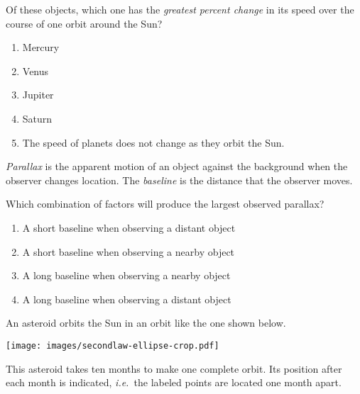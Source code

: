 \documentclass[12pt]{article}
\def\BS{\bigskip}
\newcommand{\BC}{\begin{center}}
\newcommand{\EC}{\end{center}}
\newcommand{\ie}{{\em i.e.\ }}
\begin{document}
\begin{enumerate}
\begin{minipage}{\textwidth}
{\bigskip

Of these objects, which one has the {\it greatest percent change} in its speed over the course of one orbit around the Sun?

\begin{enumerate}[label=(\Alph*)]
\setlength\itemsep{0.0em}
\item{ Mercury }
\item{ Venus }
\item{ Jupiter }
\item{ Saturn }
\item{ The speed of planets does not change as they orbit the Sun. }
\end{enumerate}
} %
\end{minipage}


\vspace{0.5in}

\begin{minipage}{\textwidth}
\item{{\it Parallax} is the apparent motion of an object against the background when the observer changes location. The {\it baseline}
is the distance that the observer moves.

Which combination of factors will produce the largest observed parallax?

\begin{enumerate}[label=(\Alph*)]
\setlength\itemsep{0.0em}
\item{ A short baseline when observing a distant object }
\item{ A short baseline when observing a nearby object }
\item{ A long baseline when observing a nearby object }
\item{ A long baseline when observing a distant object }
\end{enumerate}
} %
\end{minipage}


\vspace{0.5in}

\begin{minipage}{\textwidth}
\item{An asteroid orbits the Sun in an orbit like the one shown below.
\BS
\BC
\texttt{[image: images/secondlaw-ellipse-crop.pdf]}
\EC
\BS
This asteroid takes ten months to make one complete orbit. Its position after each month is indicated, \ie the labeled points are
located one month apart.

}
\end{minipage}
\end{enumerate}
\end{document}
